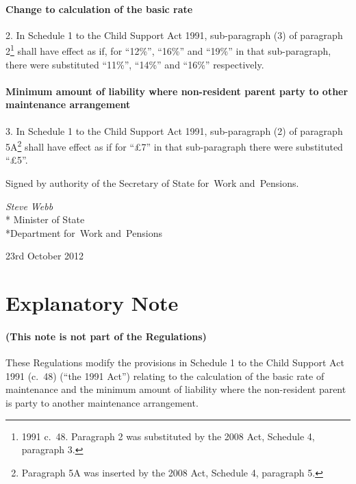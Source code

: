 \documentclass[12pt,a4paper]{article}
\begin{document}
\subsection[2. Change to calculation of the basic rate]{Change to calculation of the basic rate}

2.  In Schedule 1 to the Child Support Act 1991, sub-paragraph (3) of paragraph 2\footnote{1991 c.~48. Paragraph 2 was substituted by the 2008 Act, Schedule 4, paragraph 3.} shall have effect as if, for “12\%”, “16\%” and “19\%” in that sub-paragraph, there were substituted “11\%”, “14\%” and “16\%” respectively.

\subsection[3. Minimum amount of liability where non-resident parent party to other maintenance arrangement]{Minimum amount of liability where non-resident parent party to other maintenance arrangement}

3.  In Schedule 1 to the Child Support Act 1991, sub-paragraph (2) of paragraph 5A\footnote{Paragraph 5A was inserted by the 2008 Act, Schedule 4, paragraph 5.} shall have effect as if for “£7” in that sub-paragraph there were substituted “£5”. 

\bigskip

\pagebreak[3]

Signed 
by authority of the 
Secretary of State for~Work and~Pensions.

{\raggedleft
\emph{Steve Webb}\\*
Minister
of State\\*Department 
for~Work and~Pensions

}

23rd October 2012

\small

\part{Explanatory Note}

\renewcommand\parthead{— Explanatory Note}

\subsection*{(This note is not part of the Regulations)}

These Regulations modify the provisions in Schedule 1 to the Child Support Act 1991 (c.~48) (“the 1991 Act”) relating to the calculation of the basic rate of maintenance and the minimum amount of liability where the non-resident parent is party to another maintenance arrangement.
\end{document}
